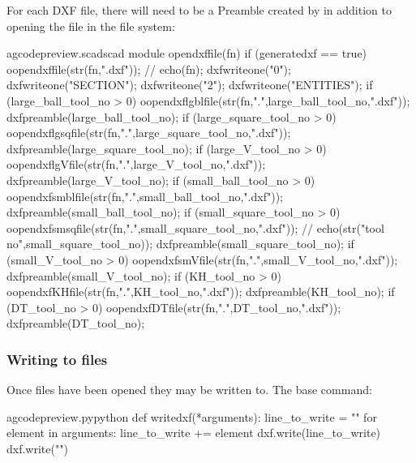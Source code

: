 \documentclass{ltxdoc}
\begin{document}
For each DXF file, there will need to be a Preamble created by 
in addition to opening the file in the file system:

\lstset{firstnumber=\thegcpscad}
\begin{writecode}{a}{gcodepreview.scad}{scad}
module opendxffile(fn) {
  if (generatedxf == true) {
      oopendxffile(str(fn,".dxf"));
//    echo(fn);
      dxfwriteone("0");
      dxfwriteone("SECTION");
      dxfwriteone("2");
      dxfwriteone("ENTITIES");
    if (large_ball_tool_no >  0) {    oopendxflgblfile(str(fn,".",large_ball_tool_no,".dxf"));
      dxfpreamble(large_ball_tool_no);
    } 
    if (large_square_tool_no >  0) {    oopendxflgsqfile(str(fn,".",large_square_tool_no,".dxf"));
      dxfpreamble(large_square_tool_no);
    } 
    if (large_V_tool_no >  0) {    oopendxflgVfile(str(fn,".",large_V_tool_no,".dxf"));
      dxfpreamble(large_V_tool_no);
    } 
    if (small_ball_tool_no >  0) { oopendxfsmblfile(str(fn,".",small_ball_tool_no,".dxf"));
      dxfpreamble(small_ball_tool_no);
    } 
    if (small_square_tool_no >  0) {    oopendxfsmsqfile(str(fn,".",small_square_tool_no,".dxf"));
//    echo(str("tool no",small_square_tool_no));
      dxfpreamble(small_square_tool_no);
    } 
    if (small_V_tool_no >  0) {    oopendxfsmVfile(str(fn,".",small_V_tool_no,".dxf"));
      dxfpreamble(small_V_tool_no);
    } 
    if (KH_tool_no >  0) {    oopendxfKHfile(str(fn,".",KH_tool_no,".dxf"));
      dxfpreamble(KH_tool_no);
    } 
    if (DT_tool_no >  0) {    oopendxfDTfile(str(fn,".",DT_tool_no,".dxf"));
      dxfpreamble(DT_tool_no);
    } 
  }
}

\end{writecode}
\addtocounter{gcpscad}{36}

\subsubsection{Writing to files}
 
Once files have been opened they may be written to. The base command: 
 
\lstset{firstnumber=\thegcpy}
\begin{writecode}{a}{gcodepreview.py}{python}
def writedxf(*arguments):
    line_to_write = ""
    for element in arguments:
        line_to_write += element
    dxf.write(line_to_write)
    dxf.write("\n")

\end{writecode}
\addtocounter{gcpy}{7}
\end{document}
